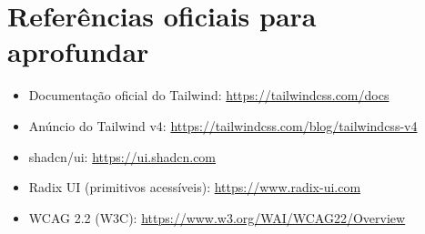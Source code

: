 \section{Referências oficiais para aprofundar}

\begin{itemize}[leftmargin=*, itemsep=0.3em]
  \item Documentação oficial do Tailwind: \url{https://tailwindcss.com/docs}
  \item Anúncio do Tailwind v4: \url{https://tailwindcss.com/blog/tailwindcss-v4}
  \item shadcn/ui: \url{https://ui.shadcn.com}
  \item Radix UI (primitivos acessíveis): \url{https://www.radix-ui.com}
  \item WCAG 2.2 (W3C): \url{https://www.w3.org/WAI/WCAG22/Overview}
\end{itemize}
